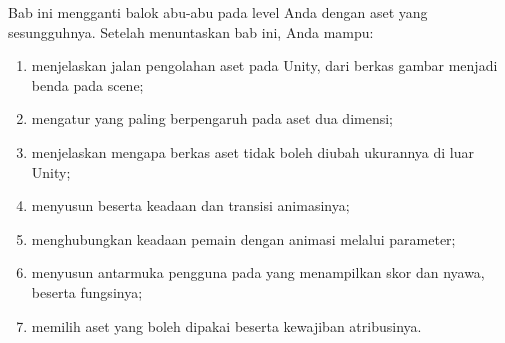 \begin{tujuanbox}
Bab ini mengganti balok abu-abu pada level Anda dengan aset yang sesungguhnya.
Setelah menuntaskan bab ini, Anda mampu:
\begin{enumerate}
  \item menjelaskan jalan pengolahan aset pada Unity, dari berkas gambar
        menjadi benda pada scene;
  \item mengatur  yang paling berpengaruh pada aset
        dua dimensi;
  \item menjelaskan mengapa berkas aset tidak boleh diubah ukurannya di luar
        Unity;
  \item menyusun  beserta keadaan dan transisi animasinya;
  \item menghubungkan keadaan pemain dengan animasi melalui parameter;
  \item menyusun antarmuka pengguna pada  yang menampilkan skor
        dan nyawa, beserta fungsinya;
  \item memilih aset yang boleh dipakai beserta kewajiban atribusinya.
\end{enumerate}
\end{tujuanbox}
